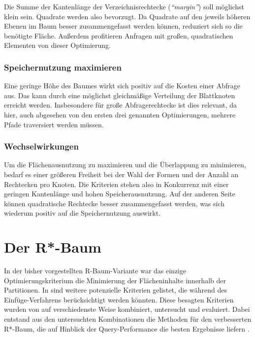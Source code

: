 \documentclass[runningheads,a4paper]{llncs}
\begin{document}
	Die Summe der Kantenlänge der Verzeichnisrechtecke (\emph{\enquote{margin}}) soll möglichst klein sein. Quadrate werden also bevorzugt. Da Quadrate auf den jeweils höheren Ebenen im Baum besser zusammengefasst werden können, reduziert sich so die benötigte Fläche.
	Außerdem profitieren Anfragen mit großen, quadratischen Elementen von dieser Optimierung. \citep[vgl.][323]{Beckmann:1990}


	\subsubsection{Speichernutzung maximieren} %
	\label{ssub:speichernutzung_maximieren}

	Eine geringe Höhe des Baumes wirkt sich positiv auf die Kosten einer Abfrage aus. Das kann durch eine möglichst gleichmäßige Verteilung der Blattknoten erreicht werden. Insbesondere für große Abfragerechtecke ist dies relevant, da hier, auch abgesehen von den ersten drei genannten Optimierungen, mehrere Pfade traversiert werden müssen. \citep[vgl.][323-324]{Beckmann:1990}


	\subsubsection{Wechselwirkungen} %
	\label{ssub:wechselwirkungen}

	Um die Flächenausnutzung zu maximieren und die Überlappung zu minimieren, bedarf es einer größeren Freiheit bei der Wahl der Formen und der Anzahl an Rechtecken pro Knoten. Die Kriterien stehen also in Konkurrenz mit einer geringen Kantenlänge und hohen Speicherausnutzung. Auf der anderen Seite können quadratische Rechtecke besser zusammengefasst werden, was sich wiederum positiv auf die Speichernutzung auswirkt. \citep[vgl.][323-324]{Beckmann:1990}



\section{Der R*-Baum} %
\label{sec:rstar_tree}

	In der bisher vorgestellten R-Baum-Variante war das einzige Optimierungskriterium die Minimierung der Flächeninhalte innerhalb der Partitionen. In  sind weitere potenzielle Kriterien gelistet, die während des Einfüge-Verfahrens berücksichtigt werden könnten. Diese besagten Kriterien wurden von \Textcite{Beckmann:1990} auf verschiedenste Weise kombiniert, untersucht und evaluiert. Dabei entstand aus den untersuchten Kombinationen die Methoden für den verbesserten R*-Baum, die auf Hinblick der Query-Performance die besten Ergebnisse liefern \citep[vgl.][329]{Beckmann:1990}.
\end{document}
